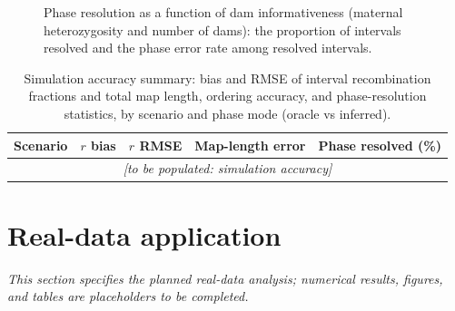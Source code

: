 \documentclass[11pt]{article}
\begin{document}
\begin{figure}[t]
\centering
{}
\caption{Phase resolution as a function of dam informativeness (maternal heterozygosity
and number of dams): the proportion of intervals resolved and the phase error rate among
resolved intervals.}
\label{fig:phaseres}
\end{figure}

\begin{table}[t]
\centering
\caption{Simulation accuracy summary: bias and RMSE of interval recombination
fractions and total map length, ordering accuracy, and phase-resolution statistics,
by scenario and phase mode (oracle vs inferred).}
\label{tab:sim_accuracy}
\begin{tabular}{lcccc}
\toprule
Scenario & $r$ bias & $r$ RMSE & Map-length error & Phase resolved (\%) \\
\midrule
\multicolumn{5}{c}{\emph{[to be populated: simulation accuracy]}} \\
\bottomrule
\end{tabular}
\end{table}

\section{Real-data application}\label{sec:realdata}
\emph{This section specifies the planned real-data analysis; numerical results, figures,
and tables are placeholders to be completed.}
\end{document}
